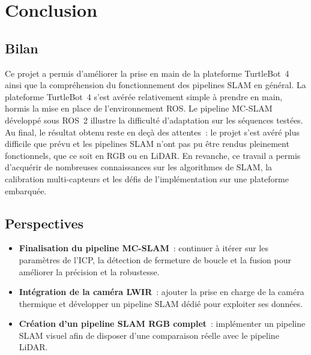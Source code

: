 \documentclass[12pt,a4paper]{report}
\begin{document}
\chapter{Conclusion}

\section{Bilan}

Ce projet a permis d'améliorer la prise en main de la plateforme TurtleBot~4
ainsi que la compréhension du fonctionnement des pipelines SLAM en général. La
plateforme TurtleBot~4 s'est avérée relativement simple à prendre en main,
hormis la mise en place de l'environnement ROS. Le pipeline MC-SLAM développé
sous ROS~2 illustre la difficulté d'adaptation sur les séquences testées. Au
final, le résultat obtenu reste en deçà des attentes~: le projet s'est avéré
plus difficile que prévu et les pipelines SLAM n'ont pas pu être rendus
pleinement fonctionnels, que ce soit en RGB ou en LiDAR. En revanche, ce
travail a permis d'acquérir de nombreuses connaissances sur les algorithmes de
SLAM, la calibration multi-capteurs et les défis de l'implémentation sur une
plateforme embarquée.

\section{Perspectives}

\begin{itemize}
  \item \textbf{Finalisation du pipeline MC-SLAM}~: continuer à itérer sur les paramètres de
        l'ICP, la détection de fermeture de boucle et la fusion pour améliorer la
        précision et la robustesse.
  \item \textbf{Intégration de la caméra LWIR}~: ajouter la prise en charge de la caméra
        thermique et développer un pipeline SLAM dédié pour exploiter ses données.
  \item \textbf{Création d'un pipeline SLAM RGB complet}~: implémenter un pipeline SLAM
        visuel afin de disposer d'une comparaison réelle avec le pipeline LiDAR.
\end{itemize}

\printbibliography[heading=bibintoc, title={Références bibliographiques}]
\end{document}
